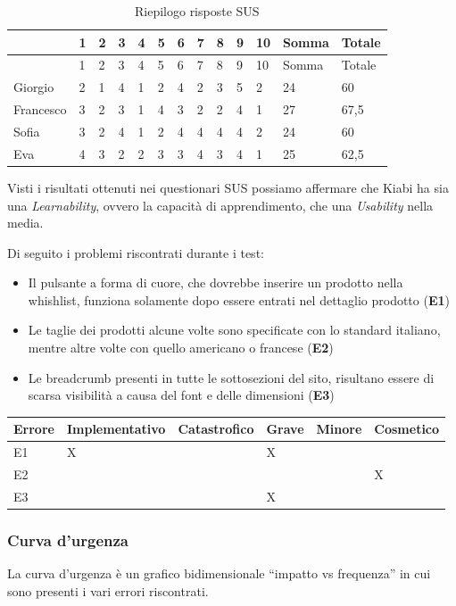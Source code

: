 \documentclass[12pt,italian,]{report}
\begin{document}
\begin{longtable}[]{@{}lllllllllllll@{}}
\caption{Riepilogo risposte SUS}\tabularnewline
\toprule
& 1 & 2 & 3 & 4 & 5 & 6 & 7 & 8 & 9 & 10 & Somma & Totale\tabularnewline
\midrule
\endfirsthead
\toprule
& 1 & 2 & 3 & 4 & 5 & 6 & 7 & 8 & 9 & 10 & Somma & Totale\tabularnewline
\midrule
\endhead
Giorgio & 2 & 1 & 4 & 1 & 2 & 4 & 2 & 3 & 5 & 2 & 24 & 60\tabularnewline
Francesco & 3 & 2 & 3 & 1 & 4 & 3 & 2 & 2 & 4 & 1 & 27 &
67,5\tabularnewline
Sofia & 3 & 2 & 4 & 1 & 2 & 4 & 4 & 4 & 4 & 2 & 24 &
60\tabularnewline
Eva & 4 & 3 & 2 & 2 & 3 & 3 & 4 & 3 & 4 & 1 & 25 &
62,5\tabularnewline
\bottomrule
\end{longtable}

Visti i risultati ottenuti nei questionari SUS possiamo affermare che Kiabi ha sia una \emph{Learnability}, ovvero la capacità di apprendimento, che una \emph{Usability} nella media.

Di seguito i problemi riscontrati durante i test:

\begin{itemize}
\item Il pulsante a forma di cuore, che dovrebbe inserire un prodotto nella whishlist, funziona solamente dopo essere entrati nel dettaglio prodotto (\textbf{E1})
\item Le taglie dei prodotti alcune volte sono specificate con lo standard italiano, mentre altre volte con quello americano o francese (\textbf{E2})
\item Le breadcrumb presenti in tutte le sottosezioni del sito, risultano essere di scarsa visibilità a causa del font e delle dimensioni (\textbf{E3})
\end{itemize}

\begin{longtable}[]{@{}llllll@{}}
\toprule
Errore & Implementativo & Catastrofico & Grave & Minore &
Cosmetico\tabularnewline
\midrule
\endhead
E1 & X & & X &\tabularnewline
E2 & & & & & X\tabularnewline
E3 & & & X & &\tabularnewline
\bottomrule
\end{longtable}

\subsubsection{Curva d'urgenza}

La curva d'urgenza è un grafico bidimensionale ``impatto vs frequenza'' in cui sono presenti i vari errori riscontrati.
\end{document}
